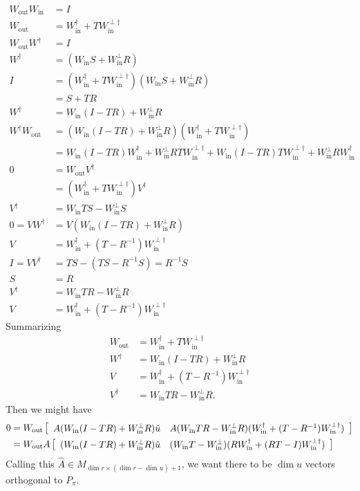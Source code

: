 \documentclass{article}
\newcommand{\mat}[2]{
    \IfInteger{#1}{
        \left[\begin{array}{*{#1}c} #2 \end{array}\right]
    }{
        \left[\begin{array}{#1} #2 \end{array}\right]}
    }
\newcommand{\Wout}{W_{\text{out}}}
\newcommand{\Win}{W_{\text{in}}}
\begin{document}
\begin{align}
    \Wout \Win &= I
    \\
    \Wout &= \Win^\dagger + T\Win^{\perp\dagger}
    \\
    \Wout W^\dagger &= I
    \\
    W^\dagger &= (\Win S + \Win^\perp R)
    \\
    I &= (\Win^\dagger + T\Win^{\perp\dagger})(\Win S + \Win^\perp R)
    \\
    &= S + TR
    \\
    W^\dagger &= \Win (I-TR) + \Win^\perp R
    \\
    W^\dagger \Wout &= (\Win (I-TR) + \Win^\perp R)(\Win^\dagger + T\Win^{\perp\dagger})
    \\
    &= \Win (I - TR)\Win^\dagger + \Win^\perp RT\Win^{\perp\dagger} + \Win(I-TR)T\Win^{\perp\dagger} + \Win^\perp R\Win^\dagger
    \\
    0 &= \Wout V^\dagger
    \\
    &= (\Win^\dagger + T\Win^{\perp\dagger})V^\dagger
    \\
    V^\dagger &= \Win TS - \Win^\perp S
    \\
    0 = VW^\dagger &= V(\Win (I-TR) + \Win^\perp R)
    \\
    V &= \Win^\dagger + (T - R^{-1})\Win^{\perp\dagger}
    \\
    I = VV^\dagger &= TS -(TS - R^{-1}S) = R^{-1}S
    \\
    S &= R
    \\
    V^\dagger &= \Win TR - \Win^\perp R
    \\
    V &= \Win^\dagger + (T - R^{-1})\Win^{\perp\dagger}
\end{align}
Summarizing
\begin{align*}
    \Wout &= \Win^\dagger + T\Win^{\perp\dagger}
    \\
    W^\dagger &= \Win (I-TR) + \Win^\perp R
    \\
    V &= \Win^\dagger + (T - R^{-1})\Win^{\perp\dagger}
    \\
    V^\dagger &= \Win TR - \Win^\perp R.
\end{align*}
Then we might have
\begin{align*}
    0 &= \Wout\mat{2}{A(\Win (I-TR) + \Win^\perp R) \hat u  & A(\Win TR - \Win^\perp R) (\Win^\dagger + (T - R^{-1})\Win^{\perp\dagger})}
    \\
    &= \Wout A\mat{2}{(\Win (I-TR) + \Win^\perp R) \hat u  & (\Win T - \Win^\perp) (R\Win^\dagger + (RT - I)\Win^{\perp\dagger})}
\end{align*}
Calling this $\hat A\in M_{\dim r\times (\dim r - \dim u) +1}$, we want there to be $\dim u$ vectors orthogonal to $P_\pi$.  
\end{document}
